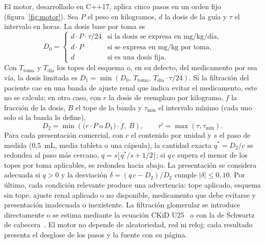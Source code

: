 \documentclass[11pt,a4paper]{article}
\begin{document}
El motor, desarrollado en C++17, aplica cinco pasos en un orden fijo (figura~\ref{fig:motor}). Sea $P$ el peso en kilogramos, $d$ la dosis de la guía y $\tau$ el intervalo en horas. La dosis base por toma es
\begin{equation}
D_0 =
\begin{cases}
d \cdot P \cdot \tau / 24 & \text{si la dosis se expresa en mg/kg/día},\\
d \cdot P & \text{si se expresa en mg/kg por toma},\\
d & \text{si es una dosis fija.}
\end{cases}
\end{equation}
Con $T_{\text{toma}}$ y $T_{\text{día}}$ los topes del esquema o, en su defecto, del medicamento por esa vía, la dosis limitada es $D_1 = \min\left(D_0,\, T_{\text{toma}},\, T_{\text{día}} \cdot \tau/24\right)$. Si la filtración del paciente cae en una banda de ajuste renal que indica evitar el medicamento, este no se calcula; en otro caso, con $r$ la dosis de reemplazo por kilogramo, $f$ la fracción de la dosis, $B$ el tope de la banda y $\tau_{\min}$ el intervalo mínimo (cada uno solo si la banda lo define),
\begin{equation}
D_2 = \min\!\left(\big(r \cdot P \ \text{o}\ D_1\big)\cdot f,\; B\right), \qquad \tau' = \max(\tau, \tau_{\min}).
\end{equation}
Para cada presentación comercial, con $c$ el contenido por unidad y $s$ el paso de medida (0,5~mL, media tableta o una cápsula), la cantidad exacta $q^{*} = D_2/c$ se redondea al paso más cercano, $q = s\lfloor q^{*}/s + 1/2\rfloor$; si $q\,c$ supera el menor de los topes por toma aplicables, se redondea hacia abajo. La presentación se considera adecuada si $q > 0$ y la desviación $\delta = (q\,c - D_2)/D_2$ cumple $|\delta| \le 0{,}10$. Por último, cada condición relevante produce una advertencia: tope aplicado, esquema sin tope, ajuste renal aplicado o no disponible, medicamento que debe evitarse y presentación inadecuada o inexistente. La filtración glomerular se introduce directamente o se estima mediante la ecuación CKiD U25~\citep{pierce2021} o con la de Schwartz de cabecera~\citep{schwartz2009}. El motor no depende de aleatoriedad, red ni reloj; cada resultado presenta el desglose de los pasos y la fuente con su página.
\end{document}
